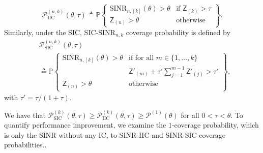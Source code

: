 \documentclass[lettersize,journal]{IEEEtran}
\begin{document}
\begin{equation}
  \label{eq:IIC-SINRprob}
  \mathcal{P}^{(n,k)}_{\text{IIC}}(\theta,\tau) \triangleq \mathbb{P}\begin{Bmatrix} \text{SINR}_{n,[k]}(\theta)>\theta & \text{if } \mathsf{Z}_{(k)}>\tau \\
\mathsf{Z}_{(n)}>\theta & \text{otherwise} \end{Bmatrix}.
\end{equation}
Similarly, under the SIC, SIC-SINR$_{n,k}$ coverage probability is defined by
\begin{align}
  \label{eq:SIC-SINRprob}
  &\mathcal{P}^{(n,k)}_{\text{SIC}}(\theta,\tau)  \nonumber\\
  &\triangleq \mathbb{P}\begin{Bmatrix} \text{SINR}_{n,[k]}(\theta)>\theta & \text{if for all }m\in\{1,\dots,k\}  \\
    & \mathsf{Z}'_{(m)}+\tau'\sum\limits_{j =1}^{m-1}\mathsf{Z}'_{(j)}>\tau'\\
\mathsf{Z}_{(n)}>\theta & \text{otherwise} \end{Bmatrix},
\end{align}
with $\tau'=\tau/(1+\tau)$.

We have that $\mathcal{P}^{(k)}_{\text{SIC}}(\theta,\tau)\geq \mathcal{P}^{(k)}_{\text{IIC}}(\theta,\tau) \geq \mathcal{P}^{(1)}(\theta)$ for all $0<\tau < \theta$. To quantify performance improvement, we examine the $1$-coverage probability, which is only the SINR without any IC, to SINR-IIC and SINR-SIC coverage probabilities..
\end{document}
